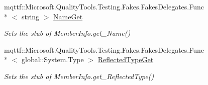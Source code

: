 \begin{DoxyCompactItemize}
mqttf\-::\-Microsoft.\-Quality\-Tools.\-Testing.\-Fakes.\-Fakes\-Delegates.\-Func\\*
$<$ string $>$ \hyperlink{class_system_1_1_reflection_1_1_fakes_1_1_stub_method_base_ae7204793811be909061d9425f952a680}{Name\-Get}
\begin{DoxyCompactList}\small\item\em Sets the stub of Member\-Info.\-get\-\_\-\-Name()\end{DoxyCompactList}\item 
mqttf\-::\-Microsoft.\-Quality\-Tools.\-Testing.\-Fakes.\-Fakes\-Delegates.\-Func\\*
$<$ global\-::\-System.\-Type $>$ \hyperlink{class_system_1_1_reflection_1_1_fakes_1_1_stub_method_base_a5d935cc7c3e591ee0eaec48bdda0ec75}{Reflected\-Type\-Get}
\begin{DoxyCompactList}\small\item\em Sets the stub of Member\-Info.\-get\-\_\-\-Reflected\-Type()\end{DoxyCompactList}\end{DoxyCompactItemize}
